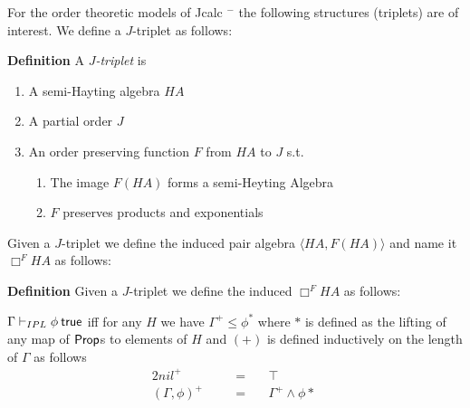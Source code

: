 			For the order theoretic models of  Jcalc $^{-}$ the following structures (triplets) 
			are of interest. We define a $J$-triplet as follows:
			\begin{mdframed}
				\textbf{Definition}
			A \emph{$J$-triplet} is 
				
			\begin{enumerate}
			\item A semi-Hayting algebra $HA$
			\item A partial order $J$
			\item An order preserving function $F$ from $HA$ to $J$ s.t.
			\begin{enumerate}
				\item The image $F(HA)$ forms a semi-Heyting Algebra
				\item $F$ preserves products and exponentials
			\end{enumerate}
			\end{enumerate}
		\end{mdframed}

			Given a $J$-triplet we define the induced pair algebra
			$\langle HA, F(HA)\rangle$
			and name it $\Box^{F}HA$ as follows:
			\begin{mdframed}
				\textbf{Definition} Given a $J$-triplet we define the induced 
				$\Box^{F}HA$ as follows:
				
		\end{mdframed}
		\begin{mdframed}
			\begin{theorem}\label{thm:PairAlgebra}
			$\Gamma\vdash_{IPL} \phi \true$ iff for any  $H$ we have $\Gamma^+\leq\phi^{*}$ where $*$ is  defined as the lifting of any map of $\prop$s to elements of $H$ and $(+)$ is defined inductively on the length of $\Gamma$ as follows
			\begin{alignat*}{2}
			  nil^+  &&\quad = & \quad\top\\
			  (\Gamma,\phi)^+&&\quad = &\quad
			  \Gamma^+\wedge\phi* \
			\end{alignat*}
			\end{theorem}
			\end{mdframed}



